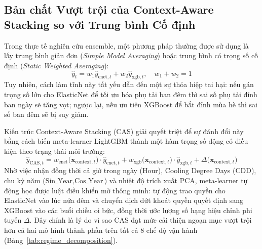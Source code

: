 \subsection{Bản chất Vượt trội của Context-Aware Stacking so với Trung bình Cố định}
Trong thực tế nghiên cứu ensemble, một phương pháp thường được sử dụng là lấy trung bình giản đơn (\textit{Simple Model Averaging}) hoặc trung bình có trọng số cố định (\textit{Static Weighted Averaging}):
\begin{equation}
    \hat{y}_t = w_1 \hat{y}_{\text{enet}, t} + w_2 \hat{y}_{\text{xgb}, t}, \quad w_1 + w_2 = 1
\end{equation}
Tuy nhiên, cách làm tĩnh này tất yếu dẫn đến một sự thỏa hiệp tai hại: nếu gán trọng số lớn cho ElasticNet để tối ưu hóa phụ tải ban đêm thì sai số phụ tải đỉnh ban ngày sẽ tăng vọt; ngược lại, nếu ưu tiên XGBoost để bắt đỉnh mùa hè thì sai số ban đêm sẽ bị suy giảm.

Kiến trúc Context-Aware Stacking (CAS) giải quyết triệt để sự đánh đổi này bằng cách biến meta-learner LightGBM thành một hàm trọng số động có điều kiện theo trạng thái môi trường:
\begin{equation}
    \hat{y}_{\text{CAS}, t} = w_{\text{enet}}\big(\mathbf{x}_{\text{context}, t}\big) \cdot \hat{y}_{\text{enet}, t} + w_{\text{xgb}}\big(\mathbf{x}_{\text{context}, t}\big) \cdot \hat{y}_{\text{xgb}, t} + \Delta\big(\mathbf{x}_{\text{context}, t}\big)
\end{equation}
Nhờ việc nhận đồng thời cả giờ trong ngày ($\text{Hour}$), Cooling Degree Days ($\text{CDD}$), chu kỳ năm ($\text{Sin\_Year}, \text{Cos\_Year}$) và nhiệt độ trích xuất PCA, meta-learner tự động học được luật điều khiển mờ thông minh: tự động trao quyền cho ElasticNet vào lúc nửa đêm và chuyển dịch dứt khoát quyền quyết định sang XGBoost vào các buổi chiều oi bức, đồng thời ước lượng số hạng hiệu chỉnh phi tuyến $\Delta$. Đây chính là lý do vì sao CAS đạt mức cải thiện ngoạn mục vượt trội hơn cả hai mô hình thành phần trên tất cả 8 chế độ vận hành (Bảng~\ref{tab:regime_decomposition}).

